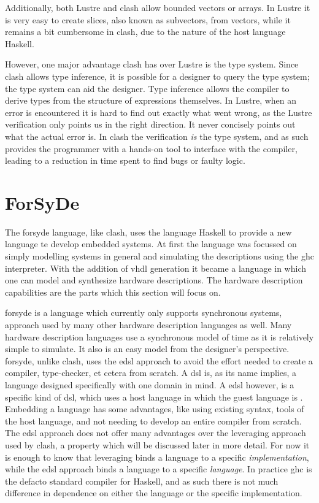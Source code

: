 Additionally, both Lustre and \gls{clash} allow bounded vectors or arrays. 
In Lustre it is very easy to create slices, also known as subvectors, from vectors, while it remains a bit cumbersome in \gls{clash}, due to the nature of the host language Haskell.

However, one major advantage \gls{clash} has over Lustre is the type system.
Since \gls{clash} allows type inference, it is possible for a designer to query the type system; the type system can aid the designer.
Type inference allows the compiler to derive types from the structure of expressions themselves.
In Lustre, when an error is encountered it is hard to find out exactly what went wrong, as the Lustre verification only points us in the right direction. 
It never concisely points out what the actual error is.
In \gls{clash} the verification \textit{is} the type system, and as such provides the programmer with a hands-on tool to interface with the compiler, leading to a reduction in time spent to find bugs or faulty logic.



\section{ForSyDe}
The \gls{forsyde}\cite{sander2004system} language, like \gls{clash}, uses the language Haskell to provide a new language te develop embedded systems.
At first the language was focussed on simply modelling systems in general and simulating the descriptions using the \gls{ghc} interpreter. 
With the addition of \gls{vhdl} generation\cite{acosta2007hardware} it became a language in which one can model and synthesize hardware descriptions.
The hardware description capabilities are the parts which this section will focus on.

\gls{forsyde} is a language which currently only supports synchronous systems, approach used by many other hardware description languages as well.
Many hardware description languages use a synchronous model of time as it is relatively simple to simulate. 
It also is an easy model from the designer's perspective.
\gls{forsyde}, unlike \gls{clash}, uses the \gls{edsl} approach to avoid the effort needed to create a compiler, type-checker, et cetera from scratch.
A \gls{dsl} is, as its name implies, a language designed specifically with one domain in mind.
A \gls{edsl} however, is a specific kind of \gls{dsl}, which uses a host language in which the guest language is .
Embedding a language has some advantages, like using existing syntax, tools of the host language, and not needing to develop an entire compiler from scratch. 
The \gls{edsl} approach does not offer many advantages over the leveraging approach used by \gls{clash}, a property which will be discussed later in more detail.
For now it is enough to know that leveraging binds a language to a specific \textit{implementation}, while the \gls{edsl} approach binds a language to a specific \textit{language}.
In practice \gls{ghc} is the defacto standard compiler for Haskell, and as such there is not much difference in dependence on either the language or the specific implementation.

